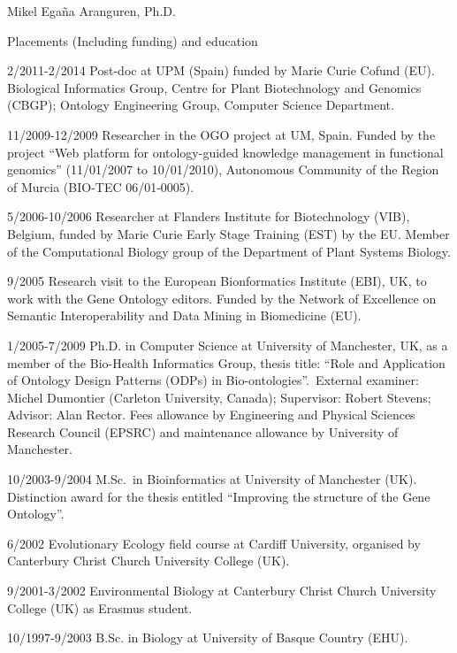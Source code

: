 \documentclass[english,11pt,a4paper,oneside]{article}
\begin{document}
\begin{cv}{Mikel Ega\~na Aranguren, Ph.D. }
\begin{cvlist}{Placements (Including funding) and education }
	\item [2/2011-2/2014] Post-doc at UPM (Spain) funded by Marie Curie Cofund (EU). Biological Informatics Group, Centre for Plant Biotechnology and Genomics (CBGP); Ontology Engineering Group, Computer Science Department.
	\item [11/2009-12/2009] Researcher in the OGO project at UM, Spain. Funded by the project ``Web platform for ontology-guided knowledge management in functional genomics'' (11/01/2007 to 10/01/2010), Autonomous Community of the Region of Murcia (BIO-TEC 06/01-0005).
	\item [5/2006-10/2006] Researcher at Flanders Institute for Biotechnology (VIB), Belgium, funded by Marie Curie Early Stage Training (EST) by the EU. Member of the Computational Biology group of the Department of Plant Systems Biology.%
	\item [9/2005] Research visit to the European Bionformatics Institute (EBI), UK, to work with the Gene Ontology editors. Funded by the Network of Excellence on Semantic Interoperability and Data Mining in Biomedicine (EU).%
	\item[1/2005-7/2009] Ph.D. in Computer Science at University of Manchester, UK, as a member of the Bio-Health Informatics Group, thesis title: ``Role and Application of Ontology Design Patterns (ODPs) in Bio-ontologies''.~External examiner: Michel Dumontier (Carleton University, Canada); Supervisor: Robert Stevens; Advisor: Alan Rector. Fees allowance by Engineering and Physical Sciences Research Council (EPSRC) and maintenance allowance by University of Manchester.
	\item[10/2003-9/2004] M.Sc.~in Bioinformatics at University of Manchester (UK). Distinction award for the thesis entitled ``Improving the structure of the Gene Ontology''.
	\item[6/2002] Evolutionary Ecology field course at Cardiff University, organised by Canterbury
	              Christ Church University College (UK).
	\item[9/2001-3/2002] Environmental Biology at Canterbury Christ Church University 
	                      College (UK) as Erasmus student.  
	\item[10/1997-9/2003] B.Sc. in Biology at University of Basque Country (EHU).
\end{cvlist}


\end{cv}
\end{document}
